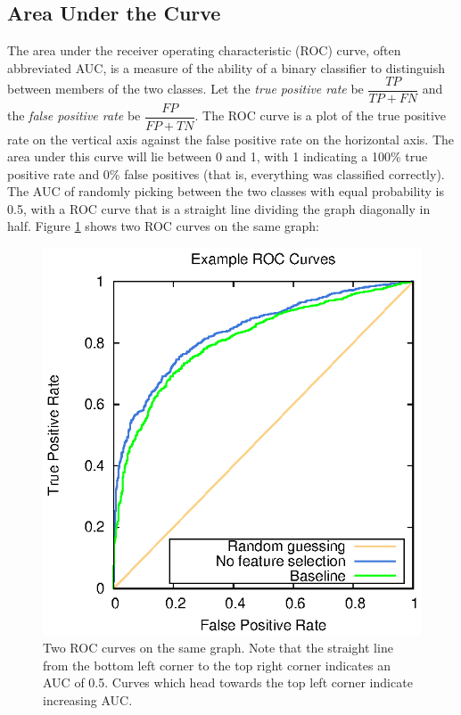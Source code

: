 \subsection{Area Under the Curve}
The area under the receiver operating characteristic (ROC) curve, often
abbreviated AUC, is a measure of the ability of a binary classifier to
distinguish between members of the two classes. Let the \textit{true
positive rate} be $\dfrac{TP}{TP + FN}$ and the \textit{false positive rate}
be $\dfrac{FP}{FP + TN}$. The ROC curve is a plot of the true positive rate
on the vertical axis against the false positive rate on the horizontal axis.
The area under this curve will lie between 0 and 1, with 1 indicating a
100\% true positive rate and 0\% false positives (that is, everything was
classified correctly). The AUC of randomly picking between the two classes
with equal probability is 0.5, with a ROC curve that is a straight line
dividing the graph diagonally in half. Figure \ref{fig:sampleroc} shows
two ROC curves on the same graph:

\begin{figure}[h]
\centering
\includegraphics{images/method/example-roc.eps}
\caption{Two ROC curves on the same graph. Note that the straight line from
the bottom left corner to the top right corner indicates an AUC of 0.5. Curves
which head towards the top left corner indicate increasing AUC.}
\label{fig:sampleroc}
\end{figure}

